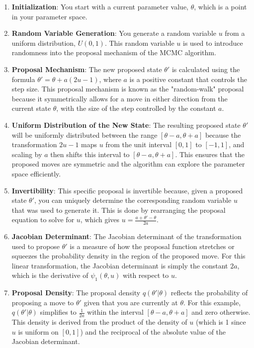 \documentclass[10pt]{article}
\begin{document}
\begin{enumerate}
  \item \textbf{Initialization}: You start with a current parameter value, \(\theta\), which is a point in your parameter space.

  \item \textbf{Random Variable Generation}: You generate a random variable \(u\) from a uniform distribution, \(U(0,1)\). This random variable \(u\) is used to introduce randomness into the proposal mechanism of the MCMC algorithm.

  \item \textbf{Proposal Mechanism}: The new proposed state \(\theta'\) is calculated using the formula \(\theta' = \theta + a(2u - 1)\), where \(a\) is a positive constant that controls the step size. This proposal mechanism is known as the "random-walk" proposal because it symmetrically allows for a move in either direction from the current state \(\theta\), with the size of the step controlled by the constant \(a\).

  \item \textbf{Uniform Distribution of the New State}: The resulting proposed state \(\theta'\) will be uniformly distributed between the range \([\theta-a, \theta+a]\) because the transformation \(2u - 1\) maps \(u\) from the unit interval \([0,1]\) to \([-1,1]\), and scaling by \(a\) then shifts this interval to \([\theta-a, \theta+a]\). This ensures that the proposed moves are symmetric and the algorithm can explore the parameter space efficiently.

  \item \textbf{Invertibility}: This specific proposal is invertible because, given a proposed state \(\theta'\), you can uniquely determine the corresponding random variable \(u\) that was used to generate it. This is done by rearranging the proposal equation to solve for \(u\), which gives \(u = \frac{a + \theta' - \theta}{2a}\).

  \item \textbf{Jacobian Determinant}: The Jacobian determinant of the transformation used to propose \(\theta'\) is a measure of how the proposal function stretches or squeezes the probability density in the region of the proposed move. For this linear transformation, the Jacobian determinant is simply the constant \(2a\), which is the derivative of \(\psi_1(\theta, u)\) with respect to \(u\).

  \item \textbf{Proposal Density}: The proposal density \(q(\theta'|\theta)\) reflects the probability of proposing a move to \(\theta'\) given that you are currently at \(\theta\). For this example, \(q(\theta'|\theta)\) simplifies to \(\frac{1}{2a}\) within the interval \([\theta-a, \theta+a]\) and zero otherwise. This density is derived from the product of the density of \(u\) (which is 1 since \(u\) is uniform on \([0,1]\)) and the reciprocal of the absolute value of the Jacobian determinant.

\end{enumerate}
\end{document}
